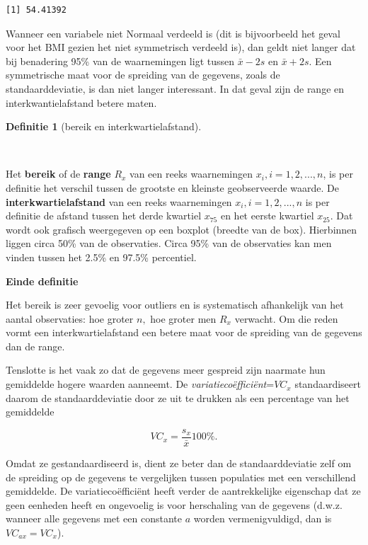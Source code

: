 \documentclass[
  dutch,
  letterpaper,
  12pt]{book}
\theoremstyle{definition}
\theoremstyle{definition}
\newtheorem{definition}{Definitie}[chapter]
\theoremstyle{definition}
\theoremstyle{remark}
\begin{document}
\begin{verbatim}
[1] 54.41392
\end{verbatim}

Wanneer een variabele niet Normaal verdeeld is (dit is bijvoorbeeld het
geval voor het BMI gezien het niet symmetrisch verdeeld is), dan geldt
niet langer dat bij benadering 95\% van de waarnemingen ligt tussen
\(\bar{x} - 2 s\) en \(\bar{x} + 2 s\). Een symmetrische maat voor de
spreiding van de gegevens, zoals de standaarddeviatie, is dan niet
langer interessant. In dat geval zijn de range en interkwantielafstand
betere maten.

\begin{definition}[bereik en
interkwartielafstand]\protect\hypertarget{def-bereik-en-interkwartielafstand}{}\label{def-bereik-en-interkwartielafstand}

~

\end{definition}

Het \textbf{bereik} of de \textbf{range} \(R_x\) van een reeks
waarnemingen \(x_i, i=1,2,...,n\), is per definitie het verschil tussen
de grootste en kleinste geobserveerde waarde. De
\textbf{interkwartielafstand} van een reeks waarnemingen
\(x_i, i=1,2,...,n\) is per definitie de afstand tussen het derde
kwartiel \(x_{75}\) en het eerste kwartiel \(x_{25}\). Dat wordt ook
grafisch weergegeven op een boxplot (breedte van de box). Hierbinnen
liggen circa 50\% van de observaties. Circa 95\% van de observaties kan
men vinden tussen het 2.5\% en 97.5\% percentiel.

\textbf{Einde definitie}

Het bereik is zeer gevoelig voor outliers en is systematisch afhankelijk
van het aantal observaties: hoe groter \(n,\) hoe groter men \(R_x\)
verwacht. Om die reden vormt een interkwartielafstand een betere maat
voor de spreiding van de gegevens dan de range.

Tenslotte is het vaak zo dat de gegevens meer gespreid zijn naarmate hun
gemiddelde hogere waarden aanneemt. De
\emph{variatiecoëfficiënt}=\(VC_x\) standaardiseert daarom de
standaarddeviatie door ze uit te drukken als een percentage van het
gemiddelde

\begin{equation*}
VC_x = \frac{s_x}{\bar{x}} 100\%.
\end{equation*}

Omdat ze gestandaardiseerd is, dient ze beter dan de standaarddeviatie
zelf om de spreiding op de gegevens te vergelijken tussen populaties met
een verschillend gemiddelde. De variatiecoëfficiënt heeft verder de
aantrekkelijke eigenschap dat ze geen eenheden heeft en ongevoelig is
voor herschaling van de gegevens (d.w.z. wanneer alle gegevens met een
constante \(a\) worden vermenigvuldigd, dan is \(VC_{ax}=VC_x\)).
\end{document}
